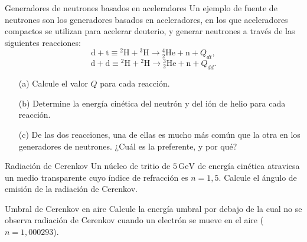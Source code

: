\begin{Ejercicio}{Generadores de neutrones basados en aceleradores}\label{Ej:09}
Un ejemplo de fuente de neutrones son los generadores basados en aceleradores, en los que aceleradores compactos se utilizan para acelerar deuterio, y generar neutrones a través de las siguientes reacciones:
\[
\mathrm{d}+\mathrm{t}\equiv {}^{2}\mathrm{H}+{}^{3}\mathrm{H}\longrightarrow {}^{4}_{2}\mathrm{He}+\mathrm{n}+Q_{dt},
\]
\[
\mathrm{d}+\mathrm{d}\equiv {}^{2}\mathrm{H}+{}^{2}\mathrm{H}\longrightarrow {}^{3}_{2}\mathrm{He}+\mathrm{n}+Q_{dd}.
\]

\begin{enumerate}
\item[(a)] Calcule el valor $Q$ para cada reacción.
\item[(b)] Determine la energía cinética del neutrón y del ión de helio para cada reacción.
\item[(c)] De las dos reacciones, una de ellas es mucho más común que la otra en los generadores de neutrones. ¿Cuál es la preferente, y por qué?
\end{enumerate}
\end{Ejercicio}


\begin{Ejercicio}{Radiación de Cerenkov}\label{Ej:10}
Un núcleo de tritio de $5\,\mathrm{GeV}$ de energía cinética atraviesa un medio transparente cuyo índice de refracción es $n=1{,}5$.  
Calcule el ángulo de emisión de la radiación de Cerenkov.
\end{Ejercicio}


\begin{Ejercicio}{Umbral de Cerenkov en aire}\label{Ej:11}
Calcule la energía umbral por debajo de la cual no se observa radiación de Cerenkov cuando un electrón se mueve en el aire ($n=1{,}000293$).
\end{Ejercicio}



